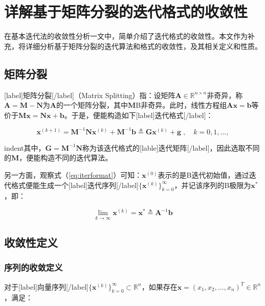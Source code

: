 \documentclass[12pt, UTF8, nofonts]{ctexart}
\begin{document}

\section*{详解基于矩阵分裂的迭代格式的收敛性}

在基本迭代法的收敛性分析一文中，简单介绍了迭代格式的收敛性。本文作为补充，将详细分析基于矩阵分裂的迭代算法和格式的收敛性，及其相关定义和性质。

\subsection*{矩阵分裂}

[label]矩阵分裂[/label]（Matrix Splitting）指：设矩阵$\boldsymbol{A}\in\mathbb{R}^{n \times n}$非奇异，称$\boldsymbol{A}=\boldsymbol{M}-\boldsymbol{N}$为$\boldsymbol{A}$的一个矩阵分裂，其中$\boldsymbol{M}$B非奇异。此时，线性方程组$\boldsymbol{Ax}=\boldsymbol{b}$等价于$\boldsymbol{Mx}=\boldsymbol{Nx}+\boldsymbol{b}$。于是，便能构造如下[label]迭代格式[/label]：

\begin{equation}
    \label{eq:iterformat}
    \boldsymbol{x}^{(k+1)} = \boldsymbol{M}^{-1}\boldsymbol{N}\boldsymbol{x}^{(k)}+\boldsymbol{M}^{-1}\boldsymbol{b} \triangleq \boldsymbol{G}\boldsymbol{x}^{(k)}+\boldsymbol{g} \;,\quad k=0,1,\ldots,
\end{equation}

indent其中，$\boldsymbol{G}=\boldsymbol{M}^{-1}\boldsymbol{N}$称为该迭代格式的[lable]迭代矩阵[/label]，因此选取不同的$\boldsymbol{M}$，便能构造不同的迭代算法。

另一方面，观察式（\ref{eq:iterformat}）可知：$\boldsymbol{x}^{(0)}$表示的是B迭代初始值，通过迭代格式便能生成一个[label]迭代序列[/label]$\{\boldsymbol{x}^{(k)}\}_{k=0}^{\infty}$，并记该序列的B极限为$\boldsymbol{x}^{\ast}$，即：

\[
    \lim_{k\to\infty}\boldsymbol{x}^{(k)} = \boldsymbol{x}^{\ast} \triangleq \boldsymbol{A}^{-1}\boldsymbol{b}
\]

\subsection*{收敛性定义}

\subsubsection*{序列的收敛定义}

对于[label]向量序列[/label]$\{\boldsymbol{x}^{(k)}\}_{k=0}^{\infty}\subset\mathbb{R}^n$，如果存在$\boldsymbol{x}=(x_1,x_2,\ldots,x_n)^T\in\mathbb{R}^{n}$，满足：
\end{document}
